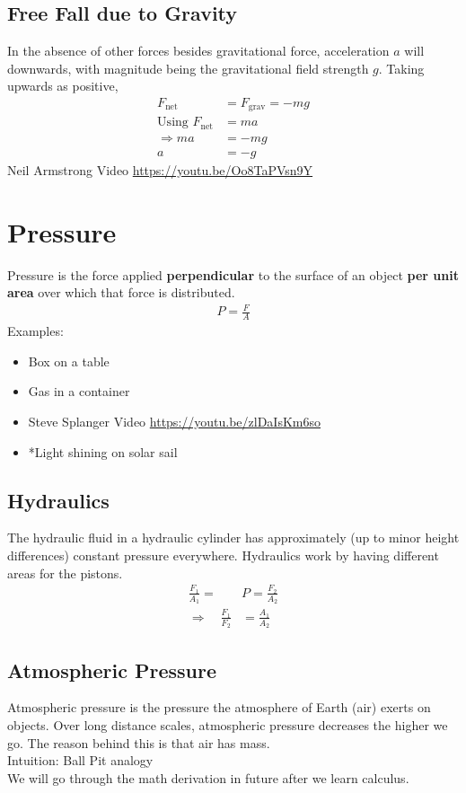 \documentclass{article}
\begin{document}
\subsection{Free Fall due to Gravity}
In the absence of other forces besides gravitational force, acceleration $a$ will downwards, with magnitude being the gravitational field strength $g$. Taking upwards as positive,
\begin{align}
    F_\text{net} &= F_\text{grav} = -mg \\
    \text{Using } F_\text{net} &= ma \\
    \Rightarrow ma &= -mg \\
    a &= -g
\end{align}
Neil Armstrong Video \href{https://youtu.be/Oo8TaPVsn9Y}{https://youtu.be/Oo8TaPVsn9Y}

\section{Pressure}
Pressure is the force applied \textbf{perpendicular} to the surface of an object \textbf{per unit area} over which that force is distributed.
\begin{align}
    P = \frac{F}{A}
\end{align}
Examples:
\begin{itemize}
    \item Box on a table
    \item Gas in a container
    \item Steve Splanger Video \href{https://youtu.be/zlDaIsKm6so}{https://youtu.be/zlDaIsKm6so}
    \item *Light shining on solar sail
\end{itemize}

\subsection{Hydraulics}
The hydraulic fluid in a hydraulic cylinder has approximately (up to minor height differences) constant pressure everywhere. Hydraulics work by having different areas for the pistons. 
\begin{align}
    \frac{F_1}{A_1} =\ & P = \frac{F_2}{A_2} \\
    \Rightarrow \quad \frac{F_1}{F_2} &= \frac{A_1}{A_2} 
\end{align}

\subsection{Atmospheric Pressure}
Atmospheric pressure is the pressure the atmosphere of Earth (air) exerts on objects. Over long distance scales, atmospheric pressure decreases the higher we go. The reason behind this is that air has mass. \\[10pt]
Intuition: Ball Pit analogy \\[10pt]
We will go through the math derivation in future after we learn calculus.
\end{document}
